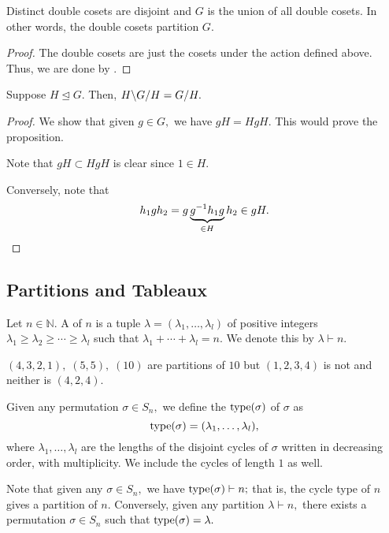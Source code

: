 \begin{prop}
	Distinct double cosets are disjoint and $G$ is the union of all double cosets. In other words, the double cosets partition $G.$
\end{prop}
\begin{proof} 
	The double cosets are just the cosets under the action defined above. Thus, we are done by .
\end{proof}

\begin{prop} \label{prop:dcosetsofnormal}
	Suppose $H \unlhd G.$ Then, $\dcos{H}{G}{H} = G/H.$
\end{prop}
\begin{proof} 
	We show that given $g \in G,$ we have $gH = HgH.$ This would prove the proposition.

	Note that $gH \subset HgH$ is clear since $1 \in H.$

	Conversely, note that
	\begin{equation*} 
		h_1gh_2 = g\underbrace{g^{-1}h_1g}_{\in H}h_2 \in gH. \qedhere
	\end{equation*}
\end{proof}

\subsection{Partitions and Tableaux} \label{subsec:partsandtableaux}
\begin{defn}%
	\label{defn:partition}
	Let $n \in \mathbb{N}.$ A  of $n$ is a tuple $\lambda = (\lambda_1, \ldots, \lambda_l)$ of positive integers $\lambda_1 \ge \lambda_2 \ge \cdots \ge \lambda_l$ such that $\lambda_1 + \cdots + \lambda_l = n.$ We denote this by $\lambda \vdash n.$
\end{defn}

\begin{ex}
	$(4, 3, 2, 1),\;(5, 5),\;(10)$ are partitions of $10$ but $(1, 2, 3, 4)$ is not and neither is $(4, 2, 4).$
\end{ex}

\begin{defn}%
	Given any permutation $\sigma \in S_n,$ we define the  $\operatorname{type}(\sigma)$ of $\sigma$ as 
	\begin{equation*} 
		\operatorname{type}(\sigma) = (\lambda_1, \ldots, \lambda_l),
	\end{equation*} 
	where $\lambda_1, \ldots, \lambda_l$ are the lengths of the disjoint cycles of $\sigma$ written in decreasing order, with multiplicity. We include the cycles of length $1$ as well.
\end{defn}
\begin{rem}
	Note that given any $\sigma \in S_n,$ we have $\operatorname{type}(\sigma) \vdash n;$ that is, the cycle type of $n$ gives a partition of $n.$ Conversely, given any partition $\lambda \vdash n,$ there exists a permutation $\sigma \in S_n$ such that $\operatorname{type}(\sigma) = \lambda.$
\end{rem}

